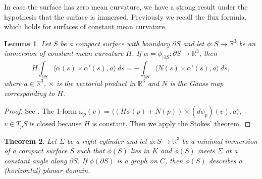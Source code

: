 \documentclass[12pt,a4paper]{amsart}
\newtheorem{theorem}{Theorem}
\newtheorem{lemma}[theorem]{Lemma}
\begin{document}
In case the surface has zero mean curvature,
we have a strong result under the hypothesis that the surface is immersed. Previously we recall the flux formula, which holds for surfaces of constant mean curvature.
\begin{lemma} Let $S$ be a compact surface with boundary $\partial S$ and let $\phi:S\rightarrow{\mathbb R}^3$ be an immersion of constant mean curvature $H$. If $\alpha=\phi_{|\partial S}:\partial S\rightarrow{\mathbb R}^3$, then
\begin{equation}\label{flux}
H\int_{\partial S}\langle\alpha(s)\times\alpha'(s),a\rangle\ ds=-\int_{\partial S}\langle N(s)\times\alpha'(s),a\rangle\ ds,
\end{equation}
where $a\in{\mathbb R}^3$, $\times$ is the vectorial product in ${\mathbb R}^3$ and $N$ is the Gauss map corresponding to $H$.
\end{lemma}
\begin{proof} See \cite[Lemma]{lm0}. The 1-form $\omega_p(v)=\langle (H\phi(p)+N(p))\times (d\phi_p)(v),a\rangle$, $v\in T_p S$ is closed because $H$ is constant. Then we apply the Stokes' theorem.
\end{proof}
\begin{theorem}\label{t3} Let $\Sigma$ be a right cylinder and let $\phi:S\rightarrow{\mathbb R}^3$ be a minimal immersion of a compact surface $S$ such that $\phi(S)$ lies in $K$ and $\phi(S)$ meets $\Sigma$ at a constant angle along $\partial S$. If $\phi(\partial S)$ is a graph on $C$, then $\phi(S)$ describes a (horizontal) planar domain.
\end{theorem}
\end{document}
